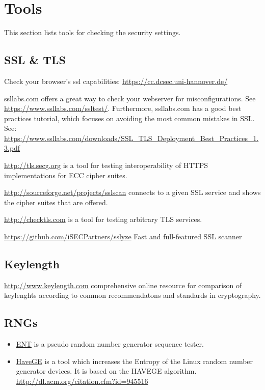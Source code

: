 \section{Tools}

This section lists tools for checking the security settings.

\subsection{SSL \& TLS}

Check your browser's ssl capabilities: \url{https://cc.dcsec.uni-hannover.de/}


ssllabs.com offers a great way to check your webserver for misconfigurations. See \url{https://www.ssllabs.com/ssltest/}.
Furthermore, ssllabs.com has a good best practices tutorial, which focuses on avoiding the most common mistakes in SSL.
See: \url{https://www.ssllabs.com/downloads/SSL_TLS_Deployment_Best_Practices_1.3.pdf}

\url{http://tls.secg.org} is a tool for testing interoperability of HTTPS implementations for ECC cipher suites.

\url{http://sourceforge.net/projects/sslscan} connects to a given SSL
service and shows the cipher suites that are offered.

\url{http://checktls.com} is a tool for testing arbitrary TLS services. 

\url{https://github.com/iSECPartners/sslyze} Fast and full-featured SSL scanner

\subsection{Keylength}

\url{http://www.keylength.com} comprehensive online resource for comparison of keylenghts according to common recommendatons and standards in cryptography.

\subsection{RNGs}

\begin{itemize}
\item \href{http://www.fourmilab.ch/random/}{ENT} is a pseudo random number generator sequence tester.  
\item \href{http://www.issihosts.com/haveged/}{HaveGE} is a tool which increases the Entropy of the Linux random number generator devices. It is based on the HAVEGE algorithm. \url{http://dl.acm.org/citation.cfm?id=945516}
\end{itemize}



